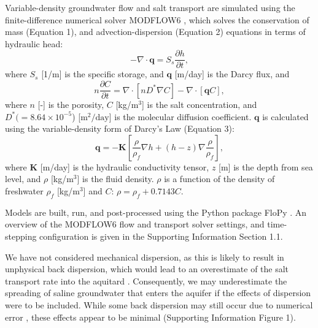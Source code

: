 \documentclass[pdflatex,sn-apa]{sn-jnl}%
\begin{document}
Variable-density groundwater flow and salt transport are simulated using the finite-difference numerical solver MODFLOW6 \citep{langevin_documentation_2017},
which solves the conservation of mass (Equation 1), and advection-dispersion (Equation 2) equations in terms of hydraulic head:
\begin{equation} \label{eq:comhead}
-\nabla \cdot \boldsymbol{q}=S_s\frac{\partial h}{\partial t},
\end{equation}
where $S_s$ [1/m] is the specific storage,  and $\boldsymbol{q}$ [m/day] is the Darcy flux, and
\begin{equation} \label{eq:consconc}
n\frac{\partial C}{\partial t}=\nabla\cdot\left[nD^{\ast}\nabla C\right]-\nabla \cdot \left[\boldsymbol{q} C \right],
\end{equation}
where $n$ [-] is the porosity,   $C$ [kg/m$^3$] is the salt concentration, and $D^*(=8.64\times10^{-5} $) [$\mathrm{m}^2/\mathrm{day}$] is the molecular diffusion coefficient. $\boldsymbol{q}$ is calculated using the variable-density form of Darcy's Law (Equation 3):
\begin{equation}
\boldsymbol{q} = -\boldsymbol{K}\left[ \frac{\rho}{\rho_f}\nabla h +(h-z)\nabla\frac{\rho}{\rho_f}\right],
\end{equation}
where  $\textbf{K}$ [m/day] is the hydraulic conductivity tensor, $z$ [m] is the depth from sea level,  and $\rho$ [kg/m$^3$] is the fluid density.
$\rho$ is a function of the density of freshwater $\rho_f$ [kg/m$^3$] and  $C$: $\rho = \rho_f + 0.7143C$.

 Models are built, run, and post-processed using the Python package FloPy \citep{bakker_scripting_2016}.
An overview of the MODFLOW6 flow and transport solver settings, and time-stepping configuration is given in the Supporting Information Section 1.1.

We have not considered mechanical dispersion, as this is likely to result in unphysical back dispersion,
which would lead to an overestimate of the salt transport rate into the aquitard \citep{smith_mixed_2004, irvine_upstream_2021}.
Consequently, we may underestimate the spreading of saline groundwater that enters the aquifer if the effects of dispersion were to be included.
While some back dispersion may still occur due to numerical error \citep{woods_numerical_2003}, these effects appear to be minimal (Supporting Information Figure 1).
\end{document}
